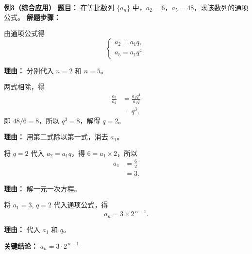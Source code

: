 \begin{examplebox}
	\medskip
	\textbf{\textcolor{CExample}{例3（综合应用）}}
	\textbf{\textcolor{CExample}{题目：}}
	在等比数列 $\{a_n\}$ 中，$a_2 = 6$，$a_5 = 48$，求该数列的通项公式。
	\textbf{\textcolor{CExample}{解题步骤：}}
	\begin{description}[style=nextline, leftmargin=2.8em, labelsep=0.5em, itemsep=0.45em]
		\item[\textbf{第一步（列方程组）：}]
			由通项公式得
			\[
				\begin{cases}
					a_2 = a_1 q,\\ a_5 = a_1 q^{4}.
			\end{cases}
			\]
			\par\textbf{理由：} 分别代入 $n=2$ 和 $n=5$。
		\item[\textbf{第二步（消去 $a_1$）：}]
			两式相除，得
			\[
				\begin{aligned}
					\frac{a_5}{a_2} &= \frac{a_1 q^{4}}{a_1 q} \\ &= q^{3},
			\end{aligned}
			\]
			即 $48 / 6 = 8$，所以 $q^{3}=8$，解得 $q = 2$。
			\par\textbf{理由：} 用第二式除以第一式，消去 $a_1$。
		\item[\textbf{第三步（回代求 $a_1$）：}]
			将 $q=2$ 代入 $a_2 = a_1 q$，得 $6 = a_1 \times 2$，所以
			\[
				\begin{aligned}
					a_1 &= \frac{6}{2} \\ &= 3.
			\end{aligned}
			\]
			\par\textbf{理由：} 解一元一次方程。
		\item[\textbf{第四步（写通项公式）：}]
			将 $a_1=3$, $q=2$ 代入通项公式，得
			\[
				a_n = 3 \times 2^{\,n-1}.
			\]
			\par\textbf{理由：} 代入 $a_1$ 和 $q$。
	\end{description}
	\textbf{\textcolor{CExample}{关键结论：}}
	\textbf{$a_n = 3 \cdot 2^{\,n-1}$}
\end{examplebox}
